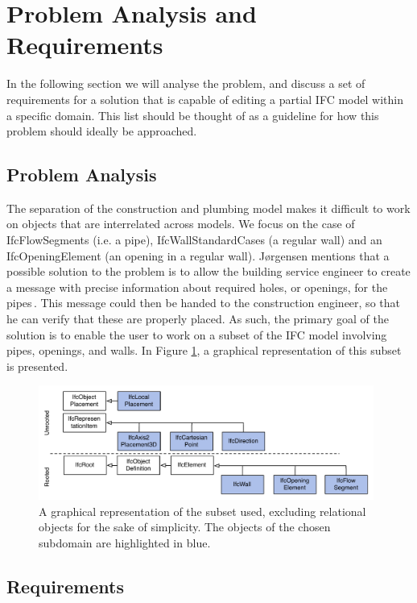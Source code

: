 \section{Problem Analysis and Requirements}
\label{sec:problem_analysis_and_requirements}
In the following section we will analyse the problem, and discuss a set of requirements for a solution that is capable of editing a partial IFC model within a specific domain. This list should be thought of as a guideline for how this problem should ideally be approached.

\subsection{Problem Analysis}
\label{subsec:problem_analysis}
The separation of the construction and plumbing model makes it difficult to work on objects that are interrelated across models. We focus on the case of IfcFlowSegments (i.e. a pipe), IfcWallStandardCases (a regular wall) and an IfcOpeningElement (an opening in a regular wall). Jørgensen mentions that a possible solution to the problem is to allow the building service engineer to create a message with precise information about required holes, or openings, for the pipes\,\cite{jorgensen12}. This message could then be handed to the construction engineer, so that he can verify that these are properly placed. As such, the primary goal of the solution is to enable the user to work on a subset of the IFC model involving pipes, openings, and walls. In Figure \ref{fig:ifcheirachy}, a graphical representation of this subset is presented.

\begin{figure}[t]
    \centering
        \includegraphics[width=110mm]{images/IfcHeirachy.pdf}
    \caption{A graphical representation of the subset used, excluding relational objects for the sake of simplicity. The objects of the chosen subdomain are highlighted in blue.}
    \label{fig:ifcheirachy}
\end{figure}

\subsection{Requirements}
\label{subsec:requirements}
